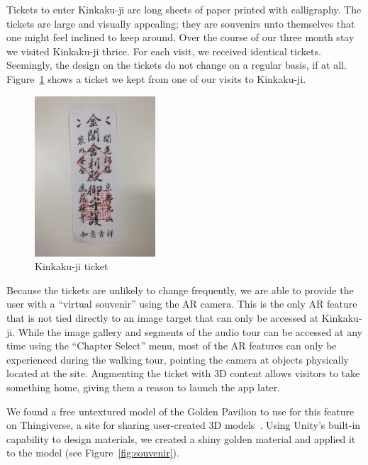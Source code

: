 \documentclass[a4paper, 10pt, american, titlepage]{article}
\begin{document}
Tickets to enter Kinkaku-ji are long sheets of paper printed with calligraphy.
The tickets are large and visually appealing; they are souvenirs unto themselves
that one might feel inclined to keep around. Over the course of our three month
stay we visited Kinkaku-ji thrice. For each visit, we received identical
tickets. Seemingly, the design on the tickets do not change on a regular basis,
if at all. Figure~\ref{fig:kinkakujiTicket} shows a ticket we kept from one of
our visits to Kinkaku-ji.

\begin{figure}[h] \centering
    \includegraphics[width=0.4\textwidth]{kinkakuji-ticket.jpeg}
    \caption{Kinkaku-ji ticket}
    \label{fig:kinkakujiTicket}
\end{figure}

Because the tickets are unlikely to change frequently, we are able to provide
the user with a ``virtual souvenir'' using the AR camera. This is the only AR
feature that is not tied directly to an image target that can only be accessed
at Kinkaku-ji. While the image gallery and segments of the audio tour can be
accessed at any time using the ``Chapter Select'' menu, most of the AR features
can only be experienced during the walking tour, pointing the camera at objects
physically located at the site. Augmenting the ticket with 3D content allows
visitors to take something home, giving them a reason to launch the app later.

We found a free untextured model of the Golden Pavilion to use for this feature
on Thingiverse, a site for sharing user-created 3D
models~\autocite{baichtal2008}. Using Unity's built-in capability to design
materials, we created a shiny golden material and applied it to the model (see
Figure~\ref{fig:souvenir}).
\end{document}

